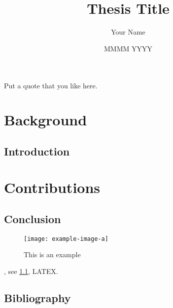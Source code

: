 \documentclass[defended]{arg-thesis} %
\title{Thesis Title}
\author{Your Name}
\date{MMMM YYYY}
\begin{document}
\begin{abstract}
    \lipsum[2-4]
\end{abstract}

\begin{acknolegements}
    \lipsum[1-2]
\end{acknolegements}

\begin{citequote}
    Put a quote that you like here.
\end{citequote}

\maketitle

\part{Background}
\chapter{Introduction}
\lipsum[2-4]

\part{Contributions}
\chapter{Conclusion}
\lipsum[2-4]
\begin{figure}
\texttt{[image: example-image-a]}
\centering
\caption[Example]{This is an example}
\label{fig:example}
\end{figure}
\cite{Zhu2019}, see \cref{fig:example}, \acrfull{LATEX}.

\chapter*{Bibliography}
\printbibliography[heading=none]
\end{document}
